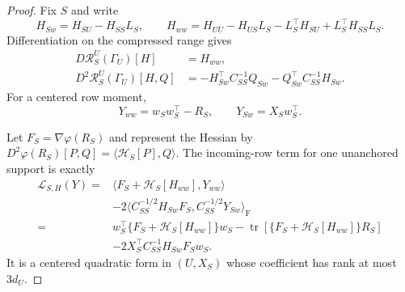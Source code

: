 \documentclass[a4paper,11pt,english]{article}
\begin{document}
\begin{proof}
Fix $S$ and write
\[
 H_{Sw}=H_{SU}-H_{SS}L_S,
 \qquad
 H_{ww}=H_{UU}-H_{US}L_S-L_S^\top H_{SU}
 +L_S^\top H_{SS}L_S.
\]
Differentiation on the compressed range gives
\begin{equation}\label{eq:residual-schur-derivatives}
\begin{split}
 D\mathcal R_S^U(\Gamma_U)[H]&=H_{ww},\\
 D^2\mathcal R_S^U(\Gamma_U)[H,Q]
 &=-H_{Sw}^\top C_{SS}^{-1}Q_{Sw}
 -Q_{Sw}^\top C_{SS}^{-1}H_{Sw}.
\end{split}
\end{equation}
For a centered row moment,
\begin{equation}\label{eq:row-residual-blocks}
 Y_{ww}=w_Sw_S^\top-R_S,
 \qquad Y_{Sw}=X_Sw_S^\top.
\end{equation}

Let $F_S=\nabla\varphi(R_S)$ and represent the Hessian by
$D^2\varphi(R_S)[P,Q]=\langle\mathcal H_S[P],Q\rangle$.  The incoming-row
term for one unanchored support is exactly
\begin{equation}\label{eq:residual-mixed-row-formula}
\begin{split}
 \mathcal L_{S,H}(Y)
 ={}&\langle F_S+\mathcal H_S[H_{ww}],Y_{ww}\rangle\\
 &-2\langle C_{SS}^{-1/2}H_{Sw}F_S,
 C_{SS}^{-1/2}Y_{Sw}\rangle_{\mathrm F}\\
 ={}&w_S^\top\{F_S+\mathcal H_S[H_{ww}]\}w_S
 -\operatorname{tr}[\{F_S+\mathcal H_S[H_{ww}]\}R_S]\\
 &-2X_S^\top C_{SS}^{-1}H_{Sw}F_Sw_S.
\end{split}
\end{equation}
It is a centered quadratic form in $(U,X_S)$ whose coefficient has rank
at most $3d_U$.


\end{proof}
\end{document}
